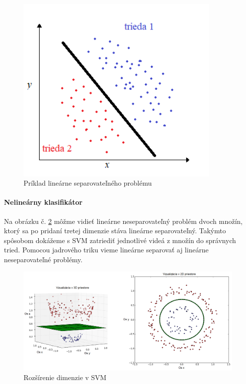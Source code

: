 \begin{figure}[H]
  \centering
  \includegraphics[width=10cm]{img/linsep.png}
  \caption{Príklad lineárne separovateľného problému}
  \label{LinSep}
\end{figure}


\paragraph{Nelineárny klasifikátor}
Na obrázku č. \ref{SVMobr} môžme vidieť lineárne neseparovateľný problém dvoch množín, ktorý sa po pridaní tretej dimenzie stáva lineárne separovateľný. Takýmto spôsobom dokážeme s SVM zatriediť jednotlivé videá z množín do správnych tried. Pomocou jadrového triku vieme lineárne separovať aj lineárne neseparovateľné problémy.\cite{c12}

\begin{figure}[H]
  \centering
  \includegraphics[width=16cm]{img/SVM.png}
  \caption{Rozšírenie dimenzie v SVM}
  \label{SVMobr}
\end{figure}

